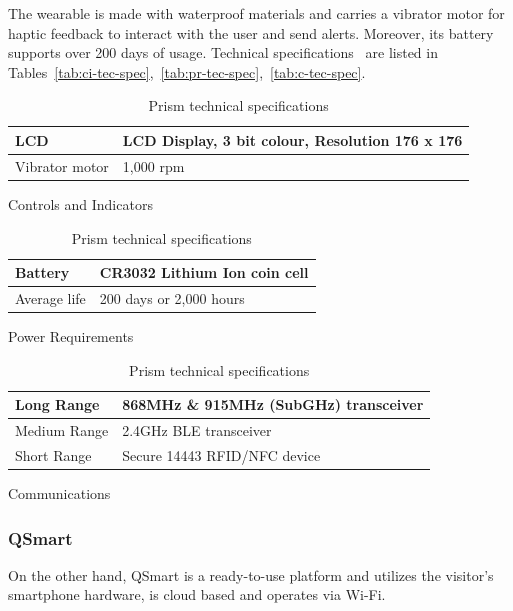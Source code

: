 The wearable is made with waterproof materials and carries a vibrator motor for haptic feedback to interact with the user and send alerts.
Moreover, its battery supports over 200 days of usage.
Technical specifications~\cite{prism-manual} are listed in Tables~\ref{tab:ci-tec-spec},~\ref{tab:pr-tec-spec},~\ref{tab:c-tec-spec}.

\begin{table}[H]
    \centering
\begin{subtable}[t]{0.85\textwidth}
    \centering
    \begin{tabular}{|l|l|}
        \hline
        LCD & LCD Display, 3 bit colour, Resolution 176 x 176 \\ \hline
        Vibrator motor & 1,000 rpm \\
        \hline
    \end{tabular}
    \caption{Controls and Indicators}
    \label{tab:ci-tec-spec}
\end{subtable}
\begin{subtable}[t]{0.85\textwidth}
    \centering
    \begin{tabular}{|l|l|}
        \hline
        Battery & CR3032 Lithium Ion coin cell \\ \hline
        Average life & 200 days or 2,000 hours \\
        \hline
    \end{tabular}
    \caption{Power Requirements}
    \label{tab:pr-tec-spec}
\end{subtable}
\begin{subtable}[t]{0.85\textwidth}
    \centering
    \begin{tabular}{|l|l|}
        \hline
        Long Range & 868MHz \& 915MHz (SubGHz) transceiver \\ \hline
        Medium Range & 2.4GHz BLE transceiver \\ \hline
        Short Range & Secure 14443 RFID/NFC device \\
        \hline
    \end{tabular}
    \caption{Communications}
    \label{tab:c-tec-spec}
\end{subtable}
    \caption{Prism technical specifications}
    \label{tab:prism-tech-spec}
\end{table}

\subsubsection*{QSmart}
On the other hand, QSmart is a ready-to-use platform and utilizes the visitor's smartphone hardware, is cloud based
and operates via Wi-Fi.


